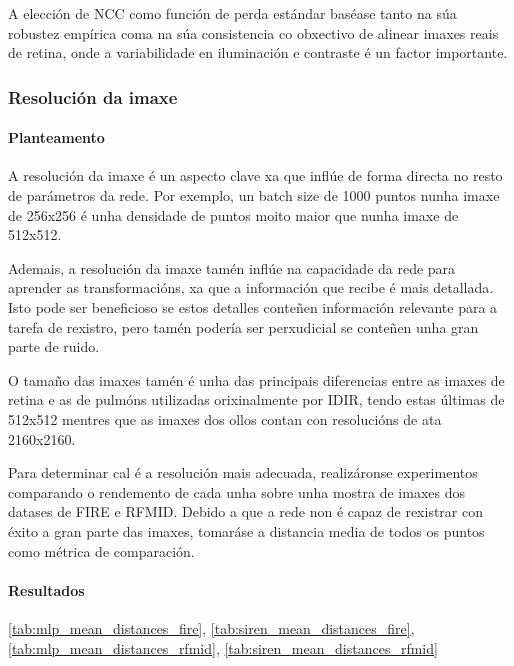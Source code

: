 A elección de NCC como función de perda estándar baséase tanto na súa robustez empírica coma na súa consistencia co obxectivo de alinear imaxes reais de retina, onde a variabilidade en iluminación e contraste é un factor importante.

\subsubsection{Resolución da imaxe}
\label{subsubsec:Resolución da imaxe}

\paragraph{Planteamento}
\label{par:Planteamento}

A resolución da imaxe é un aspecto clave xa que inflúe de forma directa no resto de parámetros da rede.
Por exemplo, un batch size de 1000 puntos nunha imaxe de 256x256 é unha densidade de puntos moito maior que nunha imaxe de 512x512.

Ademais, a resolución da imaxe tamén inflúe na capacidade da rede para aprender as transformacións, xa que a información que recibe é mais detallada. 
Isto pode ser beneficioso se estos detalles conteñen información relevante para a tarefa de rexistro, pero tamén podería ser perxudicial se conteñen unha gran parte de ruido.

O tamaño das imaxes tamén é unha das principais diferencias entre as imaxes de retina e as de pulmóns utilizadas orixinalmente por IDIR, tendo estas últimas de 512x512 mentres que as imaxes dos ollos contan con resolucións de ata 2160x2160.

Para determinar cal é a resolución mais adecuada, realizáronse experimentos comparando o rendemento de cada unha sobre unha mostra de imaxes dos datases de FIRE e RFMID.
Debido a que a rede non é capaz de rexistrar con éxito a gran parte das imaxes, tomaráse a distancia media de todos os puntos como métrica de comparación.

\paragraph{Resultados}
\label{par:Resultados}

\ref{tab:mlp_mean_distances_fire}, \ref{tab:siren_mean_distances_fire}, \ref{tab:mlp_mean_distances_rfmid}, \ref{tab:siren_mean_distances_rfmid}

